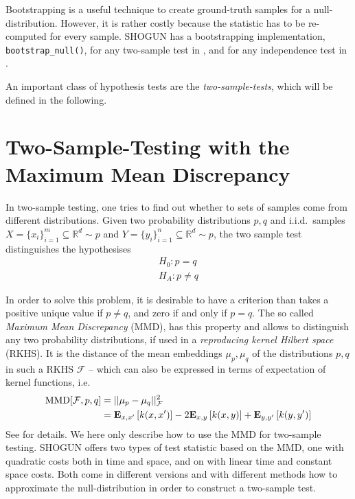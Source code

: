 Bootstrapping is a useful technique to create ground-truth samples for a null-distribution. However, it is rather costly because the statistic has to be re-computed for every sample. SHOGUN has a bootstrapping implementation, \texttt{bootstrap\_null()}, for any two-sample test in , and for any independence test in .


An important class of hypothesis tests are the \emph{two-sample-tests}, which will be defined in the following.

\section{Two-Sample-Testing with the Maximum Mean Discrepancy}
\label{sec:mmd_into}
In two-sample testing, one tries to find out whether to sets of samples come from different distributions. Given two probability distributions $p,q$ and i.i.d.\ samples $X=\{x_i\}_{i=1}^m\subseteq \mathbb{R}^d\sim p$ and $Y=\{y_i\}_{i=1}^n\subseteq \mathbb{R}^d\sim p$, the two sample test distinguishes the hypothesises
\begin{align*}
H_0: p=q\\
H_A: p\neq q
\end{align*}

In order to solve this problem, it is desirable to have a criterion than takes a positive unique value if $p\neq q$, and zero if and only if $p=q$. The so called \emph{Maximum Mean Discrepancy} (MMD), has this property and allows to distinguish any two probability distributions, if used in a \emph{reproducing kernel Hilbert space} (RKHS). It is the distance of the mean embeddings $\mu_p, \mu_q$ of the distributions $p,q$ in such a RKHS $\mathcal{F}$ -- which can also be expressed in terms of expectation of kernel functions, i.e.
\begin{align}
\label{eqn:mmd_population}
\operatorname{MMD}[\mathcal{F},p,q]&=||\mu_p-\mu_q||_\mathcal{F}^2\\
&=\textbf{E}_{x,x'}\left[ k(x,x')\right]-
  2\textbf{E}_{x,y}\left[ k(x,y)\right]
  +\textbf{E}_{y,y'}\left[ k(y,y')\right]\notag
\end{align}
See \citep[Section 2]{Gretton2012} for details. We here only describe how to use the MMD for two-sample testing. SHOGUN offers two types of test statistic based on the MMD, one with quadratic costs both in time and space, and on with linear time and constant space costs. Both come in different versions and with different methods how to approximate the null-distribution in order to construct a two-sample test.

